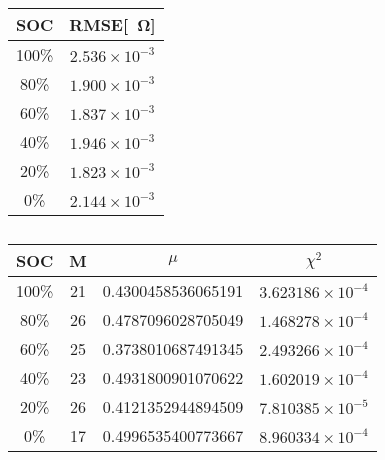 
\begin{table}[h!]
\centering
\caption{}
\begin{tabular}{|c|c|}
\hline
\textbf{SOC} & \textbf{RMSE}[\SI{}{\ohm}] \\
\hline
100\% & $2.536 \times 10^{-3}$ \\
80\% & $1.900 \times 10^{-3}$ \\
60\% & $1.837 \times 10^{-3}$ \\
40\% & $1.946 \times 10^{-3}$ \\
20\% & $1.823 \times 10^{-3}$ \\
0\% & $2.144 \times 10^{-3}$ \\
\hline
\end{tabular}
\end{table}

\begin{table}[h!]
\centering
\caption{}
\begin{tabular}{|c|c|c|c|}
\hline
SOC & M & $\mu$ & $\chi^2$ \\
\hline
100\% & 21 & 0.4300458536065191 & $3.623186 \times 10^{-4}$ \\
80\% & 26 & 0.4787096028705049 & $1.468278 \times 10^{-4}$ \\
60\% & 25 & 0.3738010687491345 & $2.493266 \times 10^{-4}$ \\
40\% & 23 & 0.4931800901070622 & $1.602019 \times 10^{-4}$ \\
20\% & 26 & 0.4121352944894509 & $7.810385 \times 10^{-5}$ \\
0\% & 17 & 0.4996535400773667 & $8.960334 \times 10^{-4}$ \\
\hline
\end{tabular}
\end{table}
